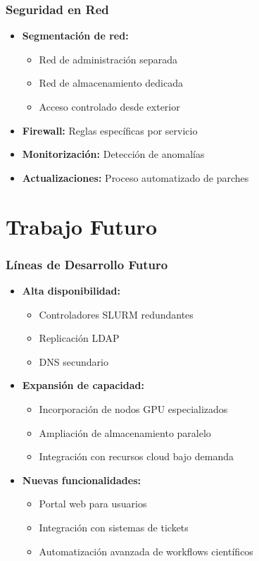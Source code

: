 \documentclass[aspectratio=169]{beamer}
\begin{document}
\begin{frame}
\frametitle{Seguridad en Red}
\begin{itemize}
    \item \textbf{Segmentación de red:}
    \begin{itemize}
        \item Red de administración separada
        \item Red de almacenamiento dedicada
        \item Acceso controlado desde exterior
    \end{itemize}
    \item \textbf{Firewall:} Reglas específicas por servicio
    \item \textbf{Monitorización:} Detección de anomalías
    \item \textbf{Actualizaciones:} Proceso automatizado de parches
\end{itemize}
\end{frame}

\section{Trabajo Futuro}

\begin{frame}
\frametitle{Líneas de Desarrollo Futuro}
\begin{itemize}
    \item \textbf{Alta disponibilidad:}
    \begin{itemize}
        \item Controladores SLURM redundantes
        \item Replicación LDAP
        \item DNS secundario
    \end{itemize}
    
    \item \textbf{Expansión de capacidad:}
    \begin{itemize}
        \item Incorporación de nodos GPU especializados
        \item Ampliación de almacenamiento paralelo
        \item Integración con recursos cloud bajo demanda
    \end{itemize}
    
    \item \textbf{Nuevas funcionalidades:}
    \begin{itemize}
        \item Portal web para usuarios
        \item Integración con sistemas de tickets
        \item Automatización avanzada de workflows científicos
    \end{itemize}
\end{itemize}
\end{frame}
\end{document}

